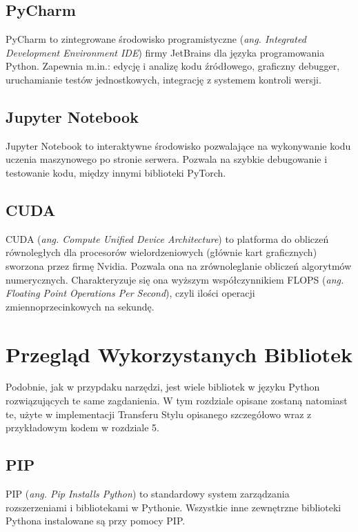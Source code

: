 \documentclass[openright]{xmgr}
\begin{document}
\section{PyCharm\label{s:dsssl}}
\indent \indent PyCharm to zintegrowane środowisko programistyczne (\textit{ang. Integrated Development Environment IDE}) firmy JetBrains dla języka programowania Python. Zapewnia m.in.: edycję i analizę kodu źródłowego, graficzny debugger, uruchamianie testów jednostkowych, integrację z systemem kontroli wersji. 
 
 \section{Jupyter Notebook\label{s:dsssl}}
 
\indent \indent Jupyter Notebook to interaktywne środowisko pozwalające na wykonywanie kodu uczenia maszynowego po stronie serwera. Pozwala na szybkie debugowanie i testowanie kodu, między innymi biblioteki PyTorch.

 \section{CUDA\label{s:dsssl}}
 
\indent \indent CUDA (\textit{ang. Compute Unified Device Architecture}) to platforma do obliczeń równoległych dla procesorów wielordzeniowych (głównie kart graficznych) sworzona przez firmę Nvidia.  Pozwala ona na zrównoleglanie obliczeń algorytmów numerycznych.  Charakteryzuje się ona wyższym współczynnikiem FLOPS (\textit{ang. Floating Point Operations Per Second}),  czyli ilości operacji zmiennoprzecinkowych na sekundę.




\chapter{Przegląd Wykorzystanych Bibliotek}


\indent \indent Podobnie, jak w przypdaku narzędzi, jest wiele bibliotek w języku Python rozwiązujących te same zagdanienia. 
W tym rozdziale opisane zostaną natomiast te, użyte w implementacji Transferu Stylu opisanego szczegółowo wraz z przykładowym kodem w rozdziale 5.

 \section{PIP\label{s:dsssl}}
 PIP (\textit{ang. Pip Installs Python}) to standardowy system zarządzania rozszerzeniami i bibliotekami w Pythonie. Wszystkie inne zewnętrzne biblioteki Pythona instalowane są przy pomocy PIP.
\end{document}
